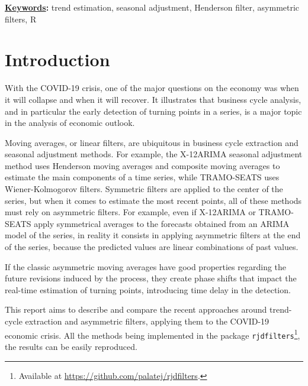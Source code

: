\documentclass[
  12pt,
  ,
  a4paper]{article}
\title{
\vspace{-5ex}
\thetitle
\vspace{-2ex}
}
\author{
\theauthors
\vspace{-5ex}
}
\date{}
\date{}
\def\thekeywords{%
trend estimation, seasonal adjustment, Henderson filter, asymmetric filters, R%
}
\begin{document}
\cfoot{\thepage} %
\sectionfont{\large\textsc}


\maketitle

{\fontsize{10pt}{12.0pt}\selectfont \textbf{\uline{Keywords}:} \thekeywords\par}\par


\hypertarget{introduction}{%
\section{Introduction}\label{introduction}}

With the COVID-19 crisis, one of the major questions on the economy was when it will collapse and when it will recover.
It illustrates that business cycle analysis, and in particular the early detection of turning points in a series, is a major topic in the analysis of economic outlook.

Moving averages, or linear filters, are ubiquitous in business cycle extraction and seasonal adjustment methods.
For example, the X-12ARIMA seasonal adjustment method uses Henderson moving averages and composite moving averages to estimate the main components of a time series, while TRAMO-SEATS uses Wiener-Kolmogorov filters.
Symmetric filters are applied to the center of the series, but when it comes to estimate the most recent points, all of these methods must rely on asymmetric filters.
For example, even if X-12ARIMA or TRAMO-SEATS apply symmetrical averages to the forecasts obtained from an ARIMA model of the series, in reality it consists in applying asymmetric filters at the end of the series, because the predicted values are linear combinations of past values.

If the classic asymmetric moving averages have good properties regarding the future revisions induced by the process, they create phase shifts that impact the real-time estimation of turning points, introducing time delay in the detection.

This report aims to describe and compare the recent approaches around trend-cycle extraction and asymmetric filters, applying them to the COVID-19 economic crisis.
All the methods being implemented in the  package \texttt{rjdfilters}\footnote{Available at \url{https://github.com/palatej/rjdfilters}.}, the results can be easily reproduced.
\end{document}
